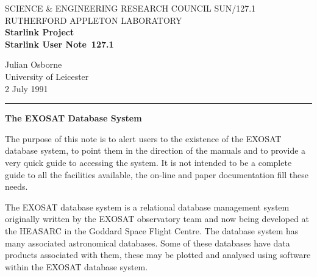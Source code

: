 \pagestyle{myheadings}

\newcommand{\stardoccategory}  {Starlink User Note}
\newcommand{\stardocinitials}  {SUN}
\newcommand{\stardocnumber}    {127.1}
\newcommand{\stardocauthors}   {Julian Osborne}
\newcommand{\stardocdate}      {2 July 1991}
\newcommand{\stardoctitle}     {The EXOSAT Database System}

\newcommand{\stardocname}{\stardocinitials /\stardocnumber}
\renewcommand{\_}{{\tt\char'137}}     %
\markright{\stardocname}
\setlength{\textwidth}{160mm}
\setlength{\textheight}{240mm}
\setlength{\topmargin}{-5mm}
\setlength{\oddsidemargin}{0mm}
\setlength{\evensidemargin}{0mm}
\setlength{\parindent}{0mm}
\setlength{\parskip}{\medskipamount}
\setlength{\unitlength}{1mm}


\thispagestyle{empty}
SCIENCE \& ENGINEERING RESEARCH COUNCIL \hfill \stardocname\\
RUTHERFORD APPLETON LABORATORY\\
{\large\bf Starlink Project\\}
{\large\bf \stardoccategory\ \stardocnumber}
\begin{flushright}
\stardocauthors\\
University of Leicester\\
\stardocdate
\end{flushright}
\vspace{-4mm}
\rule{\textwidth}{0.5mm}
\vspace{5mm}
\begin{center}
{\Large\bf \stardoctitle}
\end{center}
\vspace{5mm}

The purpose of this note is to alert users to the existence of the EXOSAT
database system, to point them in the direction of the manuals and to
provide a very quick guide to accessing the system. It is not intended to be
a complete guide to all the facilities available, the on-line
and paper documentation fill these needs.

The EXOSAT database system is a relational database management system
originally written by the EXOSAT observatory team and now being developed
at the HEASARC in the Goddard Space Flight Centre. The database system has
many associated
astronomical databases. Some of these databases have data
products associated with them, these may be plotted and analysed using
software within the EXOSAT database system.

